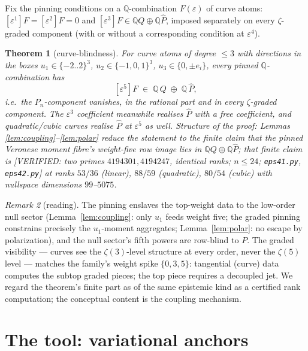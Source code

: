 \documentclass[11pt,reqno]{amsart}
\theoremstyle{plain}
\newtheorem{theorem}{Theorem}[section]
\theoremstyle{definition}
\theoremstyle{remark}
\newtheorem{remark}[theorem]{Remark}
\newcommand{\Q}{\mathbb{Q}}
\newcommand{\VerifiedR}[1]{\textup{\textsf{[VERIFIED: #1]}}}
\begin{document}
Fix the pinning conditions on a $\Q$-combination $F(\varepsilon)$ of curve
atoms: $[\varepsilon^1]F=[\varepsilon^2]F=0$ and
$[\varepsilon^3]F\in\Q Q\oplus\Q\hat P$, imposed separately on every
$\zeta$-graded component (with or without a corresponding condition at
$\varepsilon^4$).

\begin{theorem}[curve-blindness]\label{thm:blind}
For curve atoms of degree $\le3$ with directions in the boxes
$u_1\in\{-2..2\}^3$, $u_2\in\{-1,0,1\}^3$, $u_3\in\{0,\pm e_i\}$, every
pinned $\Q$-combination has
\[
[\varepsilon^5]F\;\in\;\Q\,Q\;\oplus\;\Q\,\hat P ,
\]
i.e.\ the $P_n$-component vanishes, in the rational part and in every
$\zeta$-graded component. The $\varepsilon^3$ coefficient meanwhile realises
$\hat P$ with a free coefficient, and quadratic/cubic curves realise $\hat P$
at $\varepsilon^5$ as well. Structure of the proof: Lemmas
\ref{lem:coupling}--\ref{lem:polar} reduce the statement to the finite claim
that the pinned Veronese moment fibre's weight-five row image lies in
$\Q Q\oplus\Q\hat P$; that finite claim is
\VerifiedR{two primes $4194301,4194247$, identical ranks; $n\le24$;
\texttt{eps41.py}, \texttt{eps42.py}} at ranks
$53/36$ (linear), $88/59$ (quadratic), $80/54$ (cubic) with nullspace
dimensions $99$--$5075$.
\end{theorem}

\begin{remark}[reading]
The pinning enslaves the top-weight data to the low-order null sector
(Lemma~\ref{lem:coupling}: only $u_1$ feeds weight five; the graded pinning
constrains precisely the $u_1$-moment aggregates; Lemma~\ref{lem:polar}: no
escape by polarization), and the null sector's fifth powers are row-blind to
$P$. The graded visibility --- curves see the $\zeta(3)$-level structure at
every order, never the $\zeta(5)$ level --- matches the family's weight
spike $\{0,3,5\}$: tangential (curve) data computes the subtop graded
pieces; the top piece requires a decoupled jet. We regard the theorem's
finite part as of the same epistemic kind as a certified rank computation;
the conceptual content is the coupling mechanism.
\end{remark}

\section{The tool: variational anchors}\label{sec:tool}
\end{document}

